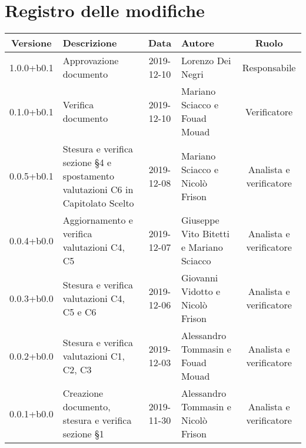 \section*{Registro delle modifiche}

\begin{center}
	\begin{longtable}{|c|p{3cm}|c|p{4cm}|c|}
	\hline
	\rowcolor{lighter-grayer}
	\textbf{Versione} & \textbf{Descrizione} & \textbf{Data} & \textbf{Autore} & \textbf{Ruolo} \\
	\hline
	\endfirsthead

	1.0.0+b0.1 & Approvazione documento & 2019-12-10 & Lorenzo Dei Negri & Responsabile \\
	\hline
	0.1.0+b0.1 & Verifica documento & 2019-12-10 & Mariano Sciacco e Fouad Mouad & Verificatore \\
	\hline
	0.0.5+b0.1 & Stesura e verifica sezione \S4 e spostamento valutazioni C6 in Capitolato Scelto & 2019-12-08 & Mariano Sciacco e Nicolò Frison & Analista e verificatore \\
	\hline
	0.0.4+b0.0 & Aggiornamento e verifica valutazioni C4, C5 & 2019-12-07 & Giuseppe Vito Bitetti e Mariano Sciacco & Analista e verificatore \\
	\hline
	0.0.3+b0.0 & Stesura e verifica valutazioni C4, C5 e C6 & 2019-12-06 & Giovanni Vidotto e Nicolò Frison & Analista e verificatore \\
	\hline
	0.0.2+b0.0 & Stesura e verifica valutazioni C1, C2, C3 & 2019-12-03 & Alessandro Tommasin e Fouad Mouad & Analista e verificatore \\
	\hline
	0.0.1+b0.0 & Creazione documento, stesura e verifica sezione \S1 & 2019-11-30 & Alessandro Tommasin e Nicolò Frison & Analista e verificatore \\
	\hline

	\end{longtable}
\end{center}
